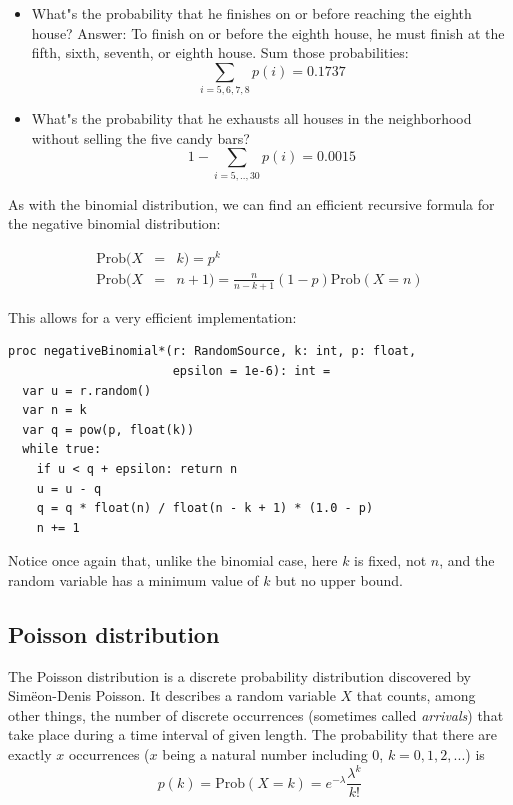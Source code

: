 \documentclass[justified, sixbynine]{tufte-book}
\def\ft{\small\tt}
\theoremstyle{plain}%
\newtheorem * {corollary}{Corollary}
\theoremstyle{definition}
\theoremstyle{remark}
\newtheorem * {remark}{Remark}
\newtheorem * {note}{Note}
\begin{document}
\begin{fullwidth}
\begin{itemize}
\item  What"s the probability that he finishes on or before reaching the
eighth house? Answer: To finish on or before the eighth house, he must
finish at the fifth, sixth, seventh, or eighth house. Sum those
probabilities:
\begin{equation}
\sum_{i=5, 6, 7, 8}p(i)=0.1737
\end{equation}

\item  What"s the probability that he exhausts all houses in the
neighborhood without selling the five candy bars?
\begin{equation}
1-\sum_{i=5, .., 30}p(i)=0.0015
\end{equation}
\end{itemize}

As with the binomial distribution, we can find an efficient recursive formula for the 
negative binomial distribution:

\begin{eqnarray}
\textrm{Prob}(X &=& k) = p^k \\
\textrm{Prob}(X &=& n+1)=\frac{n}{n-k+1}(1-p)\textrm{Prob}(X=n)
\end{eqnarray}

This allows for a very efficient implementation:

\begin{lstlisting}[caption={in file: {\ft nlib/randomgen.nim}}]
proc negativeBinomial*(r: RandomSource, k: int, p: float,
                       epsilon = 1e-6): int =
  var u = r.random()
  var n = k
  var q = pow(p, float(k))
  while true:
    if u < q + epsilon: return n
    u = u - q
    q = q * float(n) / float(n - k + 1) * (1.0 - p)
    n += 1
\end{lstlisting}

Notice once again that, unlike the binomial case, here $k$ is fixed, not $n$, and the random variable has a minimum value of $k$ but no upper bound.

\goodbreak\subsection{Poisson distribution}


The Poisson distribution is a discrete probability distribution discovered
by Sim\"{e}on-Denis Poisson. It describes a random variable
$X$ that counts, among other things, the number of
discrete occurrences (sometimes called {\it arrivals}) that take place during
a time interval of given length. The probability that there are exactly $x$
occurrences ($x$ being a natural number including 0, $k=0, 1, 2, ...$) is
\begin{equation}
p(k)=\textrm{Prob}(X=k)=e^{-\lambda }\frac{\lambda ^k}{k!}
\end{equation}


\end{fullwidth}
\end{document}
